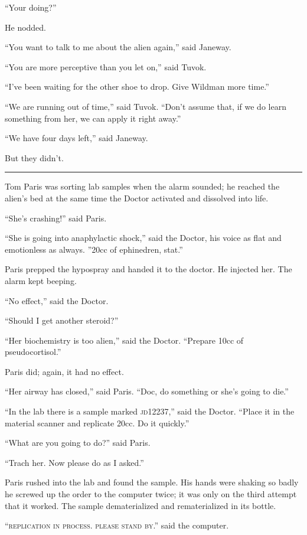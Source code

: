 \documentclass[twoside,letterpaper,12pt]{memoir}
\begin{document}
``Your doing?'' 

He nodded. 

``You want to talk to me about the alien again,'' said Janeway. 

``You are more perceptive than you let on,'' said Tuvok. 

``I've been waiting for the other shoe to drop. Give Wildman more time.'' 

``We are running out of time,'' said Tuvok. ``Don't assume that, if we do learn something from her, we can apply it right away.'' 

``We have four days left,'' said Janeway. 

But they didn't. 

\fancybreak{\rule{3cm}{0.4 pt}} 

Tom Paris was sorting lab samples when the alarm sounded; he reached the alien's bed at the same time the Doctor activated and dissolved into life. 

``She's crashing!'' said Paris. 

``She is going into anaphylactic shock,'' said the Doctor, his voice as flat and emotionless as always. ''20cc of ephinedren, stat.'' 

Paris prepped the hypospray and handed it to the doctor. He injected her. The alarm kept beeping. 

``No effect,'' said the Doctor. 

``Should I get another steroid?'' 

``Her biochemistry is too alien,'' said the Doctor. ``Prepare 10cc of pseudocortisol.'' 

Paris did; again, it had no effect. 

``Her airway has closed,'' said Paris. ``Doc, do something or she's going to die.'' 

``In the lab there is a sample marked \textsc{jd12237},'' said the Doctor. ``Place it in the material scanner and replicate 20cc. Do it quickly.'' 

``What are you going to do?'' said Paris. 

``Trach her. Now please do as I asked.'' 

Paris rushed into the lab and found the sample. His hands were shaking so badly he screwed up the order to the computer twice; it was only on the third attempt that it worked. The sample dematerialized and rematerialized in its bottle. 

``\textsc{replication in process. please stand by}.'' said the computer. 
\end{document}
